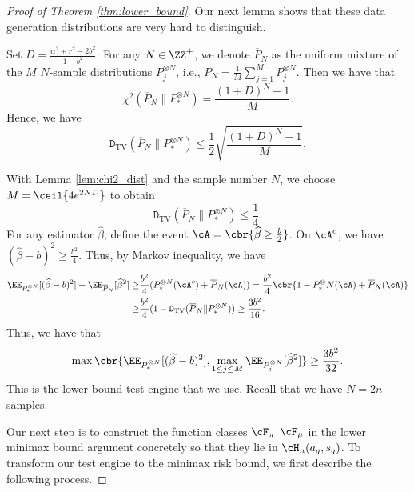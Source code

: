 \documentclass[11pt]{article}
\renewcommand{\hat}[1]{\widehat{#1}}
\begin{document}
\begin{proof}[Proof of Theorem \ref{thm:lower_bound}]
Our next lemma shows that these data generation distributions are very hard to distinguish. 
\begin{lemma}\label{lem:chi2_dist}
    Set $D=\frac{\alpha^2+r^2-2b^2}{1-b^2}$. For any $N\in\ZZ^+$, we denote $\overline{P}_N$ as the uniform mixture of the \(M\) \(N\)-sample distributions \(P_j^{\otimes N}\), i.e., $\overline{P}_N=\frac{1}{M}\sum_{j=1}^MP_j^{\otimes N}$. Then we have that
    \[
    \chi^2(\overline{P}_N\|P_*^{\otimes N})=\frac{(1+D)^N-1}{M}.
    \]
    Hence, we have
    \[
    \texttt{D}_\text{TV}(\overline{P}_N\|P_*^{\otimes N})\le \frac{1}{2}\sqrt{\frac{(1+D)^N-1}{M}}.
    \]
\end{lemma}
With Lemma \ref{lem:chi2_dist} and the sample number $N$, we choose $M=\ceil{4e^{2ND}}$ to obtain
\[
 \texttt{D}_\text{TV}(\overline{P}_N\|P_*^{\otimes N})\le \frac{1}{4}.
\]
For any estimator $\hat{\beta}$, define the event $\cA=\cbr{\hat{\beta}\ge \frac{b}{2}}$. On $\cA^c$, we have $(\hat{\beta}-b)^2\ge \frac{b^2}{4}$. Thus, by Markov inequality, we have
\begin{align*}
\EE_{P_*^{\otimes N}}[(\hat{\beta}-b)^2]+\EE_{\overline{P}_N}[\hat{\beta}^2]\ge& \frac{b^2}{4}(P_*^{\otimes N}(\cA^c)+\overline{P}_N(\cA))=\frac{b^2}{4}\cbr{1-P_*^{\otimes} N(\cA)+\overline{P}_N(\cA)}\\
\ge& \frac{b^2}{4}(1-\texttt{D}_\text{TV}(\overline{P}_N\|P_*^{\otimes N}))\ge \frac{3b^2}{16}.
\end{align*}
Thus, we have that
\[
\max\cbr{\EE_{P_*^{\otimes N}}[(\hat{\beta}-b)^2],\max_{1\le j\le M}\EE_{P_j^{\otimes N}}[\hat{\beta}^2]}\ge\frac{3b^2}{32}.
\]
This is the lower bound test engine that we use. Recall that we have $N=2n$ samples.

Our next step is to construct the function classes $\cF_{\pi}$ $\cF_{\mu}$ in the lower minimax bound argument concretely so that they lie in $\cH_n(a_q,s_q)$. To transform our test engine to the minimax risk bound, we first describe the following process.


\end{proof}
\end{document}
